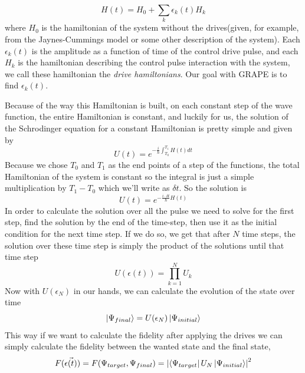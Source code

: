 \documentclass[english, a4paper, 12pt, twoside]{article}
\numberwithin{equation}{section} %
\begin{document}
\begin{equation} \label{eq:hamiltonianl_form}
H(t) = H_0 + \sum_k{\epsilon_k(t) H_k} %
\end{equation}
where $H_0$ is the hamiltonian of the system without the drives(given, for example, from the Jaynes-Cummings model or some other description of the system). Each $\epsilon_k(t)$ is the amplitude as a function of time of the control drive pulse, and each $H_k$ is the hamiltonian describing the control pulse interaction with the system, we call these hamiltonian the \textit{drive hamiltonians}. Our goal with GRAPE is to find $\epsilon_k(t)$.

Because of the way this Hamiltonian is built, on each constant step of the wave function, the entire Hamiltonian is constant, and luckily for us, the solution of the Schrodinger equation for a constant Hamiltonian is pretty simple and given by
\begin{equation}
U(t) = e^{-\frac{i}{\hbar}\int_{T_0}^{T_1}H(t)dt}
\end{equation}
Because we chose $T_0$ and $T_1$ as the end points of a step of the functions, the total Hamiltonian of the system is constant so the integral is just a simple multiplication by $T_1-T_0$ which we'll write as $\delta t$. So the solution is
\begin{equation}
U(t) = e^{-\frac{i\cdot \delta t}{\hbar}H(t)}
\end{equation}
In order to calculate the solution over all the pulse we need to solve for the first step, find the solution by the end of the time-step, then use it as the initial condition for the next time step. If we do so, we get that after $N$ time steps, the solution over these time step is simply the product of the solutions until that time step
\begin{equation}\label{eq:U_def_prod}
U(\epsilon(t)) = \prod_{k = 1}^NU_k
\end{equation}
Now with $U(\epsilon_N)$ in our hands, we can calculate the evolution of the state over time
\begin{equation}
\ket{\Psi_{final}} = U(\epsilon_N)\ket{\Psi_{initial}}
\end{equation}
This way if we want to calculate the fidelity after applying the drives we can simply calculate the fidelity between the wanted state and the final state,
\begin{equation} \label{eq:fidelity_sim}
F(\Vec{\epsilon(t)}) = F(\Psi_{target}, \Psi_{final}) = \abs{\bra{\Psi_{target}}U_N\ket{\Psi_{initial}}}^2
\end{equation}
\end{document}
